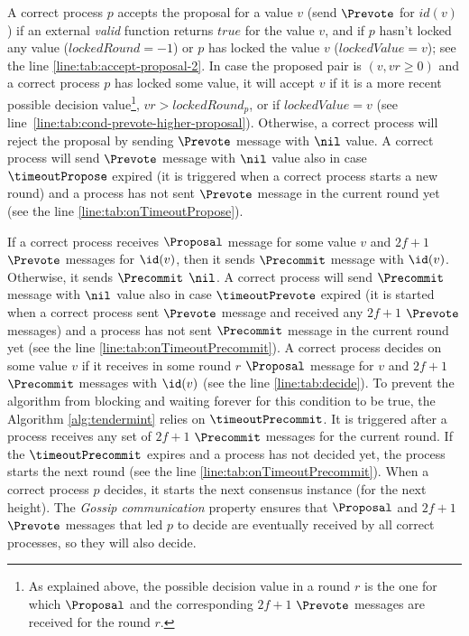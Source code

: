A correct process $p$ accepts the proposal for a value $v$  (send $\Prevote$
for $id(v)$) if an external \emph{valid} function returns $true$ for the value
$v$, and if $p$ hasn't locked any value ($lockedRound = -1$) or $p$ has locked
the value $v$ ($lockedValue = v$); see the line
\ref{line:tab:accept-proposal-2}.  In case the proposed pair is $(v,vr \ge 0)$ and a
correct process $p$ has locked some value, it will accept
$v$ if it is a more recent possible decision value\footnote{As
explained above, the possible decision value in a round $r$ is the one for
which $\Proposal$ and the corresponding $2f+1$ $\Prevote$ messages are received
for the round $r$.}, $vr > lockedRound_p$,  or if $lockedValue = v$ 
(see line~\ref{line:tab:cond-prevote-higher-proposal}).  Otherwise, a correct
process will reject the proposal by sending $\Prevote$ message with $\nil$
value. A correct process will send $\Prevote$ message with $\nil$ value also in
case $\timeoutPropose$ expired (it is triggered when a correct process starts a
new round) and a process has not sent $\Prevote$ message in the current round
yet (see the line \ref{line:tab:onTimeoutPropose}). 

If a correct process receives $\Proposal$ message for some value $v$ and $2f+1$
$\Prevote$ messages for $\id(v)$, then it sends $\Precommit$ message with
$\id(v)$. Otherwise, it sends $\Precommit$ $\nil$. A correct process will send
$\Precommit$ message with $\nil$ value also in case $\timeoutPrevote$ expired
(it is started when a correct process sent $\Prevote$ message and received any
$2f+1$ $\Prevote$ messages)  and a process has not sent $\Precommit$ message in
the current round yet (see the line \ref{line:tab:onTimeoutPrecommit}).  A
correct process decides on some value $v$ if it receives in some round $r$
$\Proposal$ message for $v$ and $2f+1$ $\Precommit$ messages with $\id(v)$ (see
the line \ref{line:tab:decide}).  To prevent the algorithm from blocking and
waiting forever for this condition to be true, the Algorithm
\ref{alg:tendermint} relies on $\timeoutPrecommit$. It is triggered after a
process receives any set of $2f+1$ $\Precommit$ messages for the current round.
If the $\timeoutPrecommit$ expires and a process has not decided yet, the
process starts the next round (see the line \ref{line:tab:onTimeoutPrecommit}).
When a correct process $p$ decides, it starts the next consensus instance 
(for the next height). The \emph{Gossip communication} property ensures 
that $\Proposal$ and $2f+1$ $\Prevote$ messages that led $p$ to decide 
are eventually received by all correct processes, so they will also decide. 


